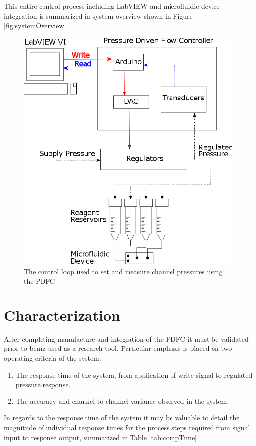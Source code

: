 This entire control process including LabVIEW and microfluidic device integration is summarized in system overview shown in Figure \vref{fig:systemOverview}.



\begin{figure}[H]
\centering 
\includegraphics[width=0.65\columnwidth]{systemOverview.PNG} 
\caption[System Overview of the PDFC]{The control loop used to set and measure channel pressures using the PDFC} 
\label{fig:systemOverview} 
\end{figure}

\clearpage

\section{Characterization}
\label{sec:characterization}


After completing manufacture and integration of the PDFC it must be validated prior to being used as a research tool. Particular emphasis is placed on two operating criteria of the system:
\begin{enumerate}
\item The response time of the system, from application of write signal to regulated pressure response.
\item The accuracy and channel-to-channel variance observed in the system.
\end{enumerate}

In regards to the response time of the system it may be valuable to detail the magnitude of individual response times for the process steps required from signal input to response output, summarized in Table \vref{tab:compTime}

